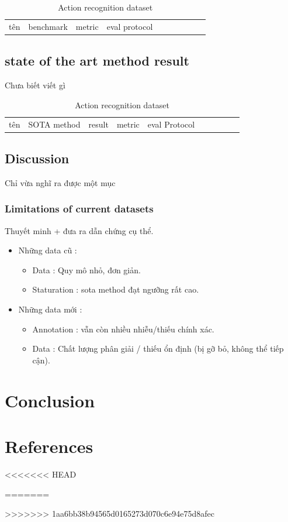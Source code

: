 \documentclass[a4paper]{article}
\begin{document}
\begin{table}[h]
	\centering
	\caption{Action recognition dataset}
	\begin{tabular}{l|l l l l l l l l l}
		\toprule
		tên & benchmark & metric & eval protocol \\
	\end{tabular}%
	\label{config3}
\end{table}%

\subsection{state of the art method result}

Chưa biết viết gì

\begin{table}[h]
	\centering
	\caption{Action recognition dataset}
	\begin{tabular}{l|l l l l l l l l l}
		\toprule
		tên & SOTA method & result & metric & eval Protocol \\
	\end{tabular}%
	\label{config4}
\end{table}%

\subsection{Discussion}

Chỉ vừa nghĩ ra được một mục

\subsubsection{Limitations of current datasets}

Thuyết minh + đưa ra dẫn chứng cụ thể.

\begin{itemize}
	\item Những data cũ :
	\begin{itemize}
		\item Data : Quy mô nhỏ, đơn giản.
		\item Staturation : sota method đạt ngưỡng rất cao.
	\end{itemize}
	
	\item Những data mới :
	\begin{itemize}
		\item Annotation : vẫn còn nhiều nhiễu/thiếu chính xác.
		\item Data : Chất lượng phân giải / thiếu ổn định (bị gỡ bỏ, không thể tiếp cận).
	\end{itemize}
	
\end{itemize}

\section{Conclusion}

\section{References}
<<<<<<< HEAD



=======

>>>>>>> 1aa6bb38b94565d0165273d070c6e94e75d8afec
\end{document}
